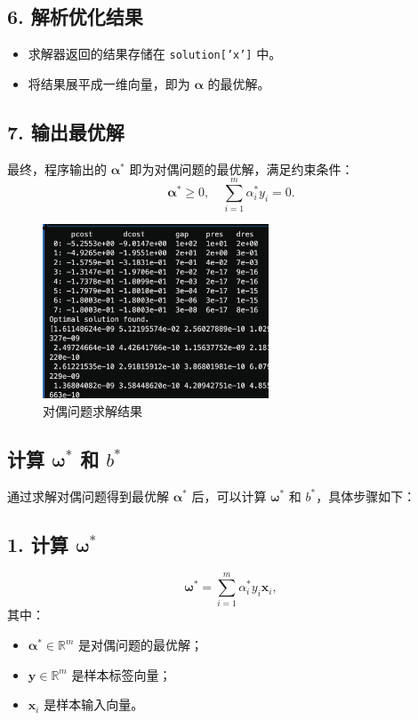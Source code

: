 \documentclass[12pt,a4paper,oneside]{article}
\begin{document}
\subsection*{6. 解析优化结果}
\begin{itemize}
    \item 求解器返回的结果存储在 \texttt{solution['x']} 中。
    \item 将结果展平成一维向量，即为 $\bm{\alpha}$ 的最优解。
\end{itemize}

\subsection*{7. 输出最优解}
最终，程序输出的 $\bm{\alpha}^*$ 即为对偶问题的最优解，满足约束条件：
\[
\bm{\alpha}^* \geq 0, \quad \sum_{i=1}^m \alpha_i^* y_i = 0.
\]

\begin{figure}[H]
    \centering
    \includegraphics[width=0.6\textwidth]{image/2.png}
    \caption{对偶问题求解结果}
\end{figure}
\subsection{计算 $\bm{\omega}^*$ 和 $b^*$}


通过求解对偶问题得到最优解 $\bm{\alpha}^*$ 后，可以计算 $\bm{\omega}^*$ 和 $b^*$，具体步骤如下：

\subsection*{1. 计算 $\bm{\omega}^*$}
\[
\bm{\omega}^* = \sum_{i=1}^m \alpha_i^* y_i \bm{x}_i,
\]
其中：
\begin{itemize}
    \item $\bm{\alpha}^* \in \mathbb{R}^m$ 是对偶问题的最优解；
    \item $\bm{y} \in \mathbb{R}^m$ 是样本标签向量；
    \item $\bm{x}_i$ 是样本输入向量。
\end{itemize}
\end{document}
